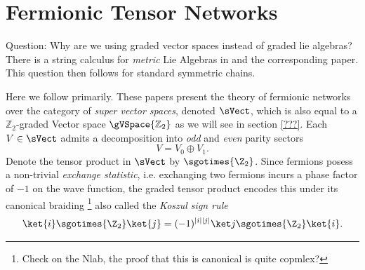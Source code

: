 \section{Fermionic Tensor Networks}
\label{sect:fermionicTensorNetworks}

Question: Why are we using graded vector spaces instead of graded lie algebras?
There is a string calculus for \emph{metric} Lie Algebras in
\cite{nlab:tree_tensor_network_state} and the corresponding paper.
This question then follows for standard symmetric chains.


Here we follow \cite{bultinckFermionicMatrixProduct2017,gaoFermionicTensorNetwork2025,mortierFermionicTensorNetwork2025} primarily. These papers present the theory of fermionic networks over the category of \emph{super vector spaces}, denoted $\sVect$, which is also equal to a $\mathbb{Z}_2$-graded Vector space $\gVSpace{\mathbb{Z}_2}$ as we will see in section \cref{???}. Each $V \in \sVect$ admits a decomposition into \emph{odd} and \emph{even} parity sectors 
\[
  V = V_0 \oplus V_1.
\] Denote the tensor product in $\sVect$ by $\sgotimes{\Z_2}$. Since fermions posess a non-trivial \emph{exchange statistic}, i.e. exchanging two fermions incurs a phase factor of $-1$ on the wave function, the graded tensor product encodes this under its canonical braiding \footnote{Check on the Nlab, the proof that this is canonical is quite copmlex?} %
also called the \emph{Koszul sign rule} 
\begin{equation}
  \ket{i} \sgotimes{\Z_2} \ket{j} = (-1)^{\left\vert i \right\vert \left\vert j \right\vert } \ket j \sgotimes{\Z_2} \ket{i}.
\end{equation}
